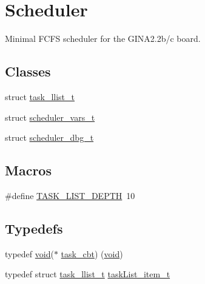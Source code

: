 \hypertarget{group___scheduler}{}\section{Scheduler}
\label{group___scheduler}


Minimal F\+C\+FS scheduler for the G\+I\+N\+A2.\+2b/c board.  


\subsection*{Classes}
\begin{DoxyCompactItemize}
\item 
struct \hyperlink{structtask__llist__t}{task\+\_\+llist\+\_\+t}
\item 
struct \hyperlink{structscheduler__vars__t}{scheduler\+\_\+vars\+\_\+t}
\item 
struct \hyperlink{structscheduler__dbg__t}{scheduler\+\_\+dbg\+\_\+t}
\end{DoxyCompactItemize}
\subsection*{Macros}
\begin{DoxyCompactItemize}
\item 
\#define \hyperlink{group___scheduler_gaab36173783d65a27ad398a411d01bf98}{T\+A\+S\+K\+\_\+\+L\+I\+S\+T\+\_\+\+D\+E\+P\+TH}~10
\end{DoxyCompactItemize}
\subsection*{Typedefs}
\begin{DoxyCompactItemize}
\item 
typedef \hyperlink{usb__devapi_8h_afabf60e7f57651d6d595a02c75f07cd0}{void}($\ast$ \hyperlink{group___scheduler_gad18d3f32b9193516d5f1849adc9d434e}{task\+\_\+cbt}) (\hyperlink{usb__devapi_8h_afabf60e7f57651d6d595a02c75f07cd0}{void})
\item 
typedef struct \hyperlink{structtask__llist__t}{task\+\_\+llist\+\_\+t} \hyperlink{group___scheduler_ga35a54119c3c60da01e15fb98e49f582b}{task\+List\+\_\+item\+\_\+t}
\end{DoxyCompactItemize}
